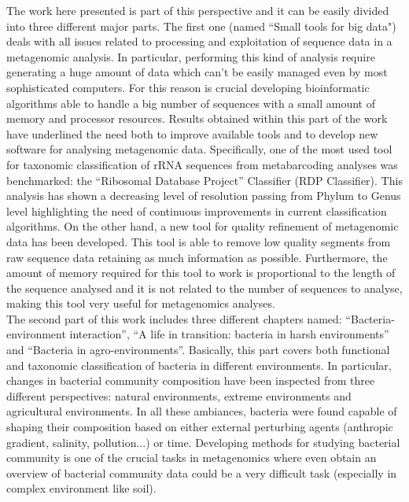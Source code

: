 The work here presented is part of this perspective and it can be easily divided into three different major parts. The first one (named ``Small tools for big data") deals with all issues related to processing and exploitation of sequence data in a metagenomic analysis. In particular, performing this kind of analysis require generating a huge amount of data which can't be easily managed even by most sophisticated computers. For this reason is crucial developing bioinformatic algorithms able to handle a big number of sequences with a small amount of memory and processor resources. Results obtained within this part of the work have underlined the need both to improve available tools and to develop new software for analysing metagenomic data. Specifically, one of the most used tool for taxonomic classification of rRNA sequences from metabarcoding analyses was benchmarked: the ``Ribosomal Database Project'' Classifier (RDP Classifier). This analysis has shown a decreasing level of resolution passing from Phylum to Genus level highlighting the need of continuous improvements in current classification algorithms. On the other hand, a new tool for quality refinement of metagenomic data has been developed. This tool is able to remove low quality segments from raw sequence data retaining as much information as possible. Furthermore, the amount of memory required for this tool to work is proportional to the length of the sequence analysed and it is not related to the number of sequences to analyse, making this tool very useful for metagenomics analyses.\\
The second part of this work includes three different chapters named: ``Bacteria-environment interaction'', ``A life in transition: bacteria in harsh environments'' and ``Bacteria in agro-environments''. Basically, this part covers both functional and taxonomic classification of bacteria in different environments. In particular, changes in bacterial community composition have been inspected from three different perspectives: natural environments, extreme environments and agricultural environments. In all these ambiances, bacteria were found capable of shaping their composition based on either external perturbing agents (anthropic gradient, salinity, pollution...) or time. Developing methods for studying bacterial community is one of the crucial tasks in metagenomics where even obtain an overview of bacterial community data could be a very difficult task (especially in complex environment like soil).\\
